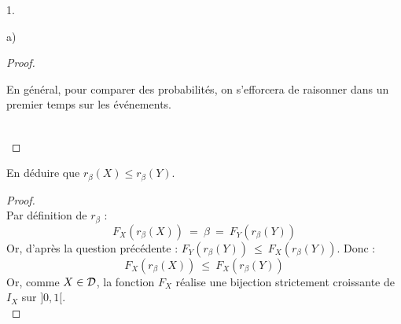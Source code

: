 \begin{noliste}{1.}
\begin{noliste}{a)}
\begin{proof}
      \begin{remark}
        En général, pour comparer des probabilités, on s'efforcera
        de raisonner dans un premier temps sur les événements.
      \end{remark}~\\[-1.4cm]
    \end{proof}

    
    \item En déduire que $r_\beta(X) \leq r_\beta(Y)$. 
    
    \begin{proof}~\\
      Par définition de $r_\beta$ :
      \[
        F_X(r_\beta(X)) \ = \ \beta \ = \
        F_Y(r_\beta(Y))
      \]
      Or, d'après la question précédente : $F_Y(r_\beta(Y)) \ \leq 
      \ F_X(r_\beta(Y))$. Donc :
      \[
        F_X(r_\beta(X)) \ \leq \ F_X(r_\beta(Y))
      \]
      Or, comme $X \in {\cal D}$, la fonction $F_X$ réalise une 
      bijection strictement croissante de $I_X$ sur $]0,1[$.
      ~\\[-1cm]
    \end{proof}
  \end{noliste}
\end{noliste}


\newpage


